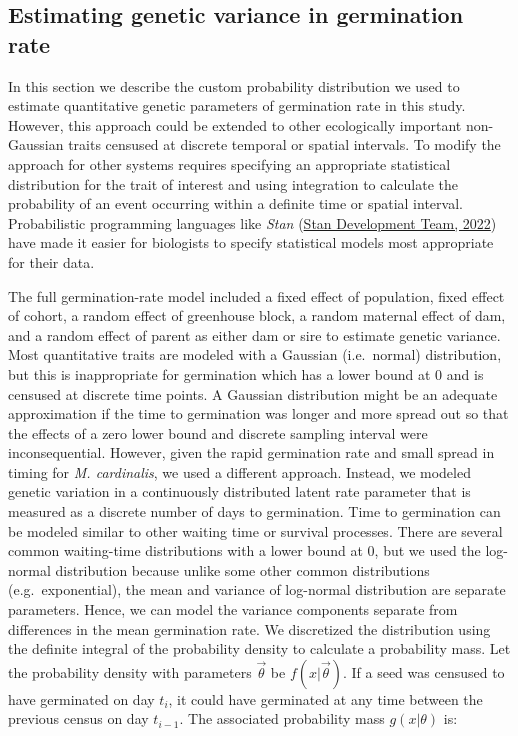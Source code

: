 \documentclass[
  12pt,
]{article}
\begin{document}
\hypertarget{estimating-genetic-variance-in-germination-rate}{%
\subsection{Estimating genetic variance in germination rate}\label{estimating-genetic-variance-in-germination-rate}}

In this section we describe the custom probability distribution we used to estimate quantitative genetic parameters of germination rate in this study. However, this approach could be extended to other ecologically important non-Gaussian traits censused at discrete temporal or spatial intervals. To modify the approach for other systems requires specifying an appropriate statistical distribution for the trait of interest and using integration to calculate the probability of an event occurring within a definite time or spatial interval. Probabilistic programming languages like \emph{Stan} (\protect\hyperlink{ref-stan_development_team_stan_2022}{Stan Development Team, 2022}) have made it easier for biologists to specify statistical models most appropriate for their data.

The full germination-rate model included a fixed effect of population, fixed effect of cohort, a random effect of greenhouse block, a random maternal effect of dam, and a random effect of parent as either dam or sire to estimate genetic variance. Most quantitative traits are modeled with a Gaussian (i.e.~normal) distribution, but this is inappropriate for germination which has a lower bound at \(0\) and is censused at discrete time points. A Gaussian distribution might be an adequate approximation if the time to germination was longer and more spread out so that the effects of a zero lower bound and discrete sampling interval were inconsequential. However, given the rapid germination rate and small spread in timing for \emph{M. cardinalis}, we used a different approach. Instead, we modeled genetic variation in a continuously distributed latent rate parameter that is measured as a discrete number of days to germination. Time to germination can be modeled similar to other waiting time or survival processes. There are several common waiting-time distributions with a lower bound at \(0\), but we used the log-normal distribution because unlike some other common distributions (e.g.~exponential), the mean and variance of log-normal distribution are separate parameters. Hence, we can model the variance components separate from differences in the mean germination rate. We discretized the distribution using the definite integral of the probability density to calculate a probability mass. Let the probability density with parameters \(\vec{\theta}\) be \(f(x|\vec{\theta})\). If a seed was censused to have germinated on day \(t_i\), it could have germinated at any time between the previous census on day \(t_{i-1}\). The associated probability mass \(g(x|\theta)\) is:
\end{document}
